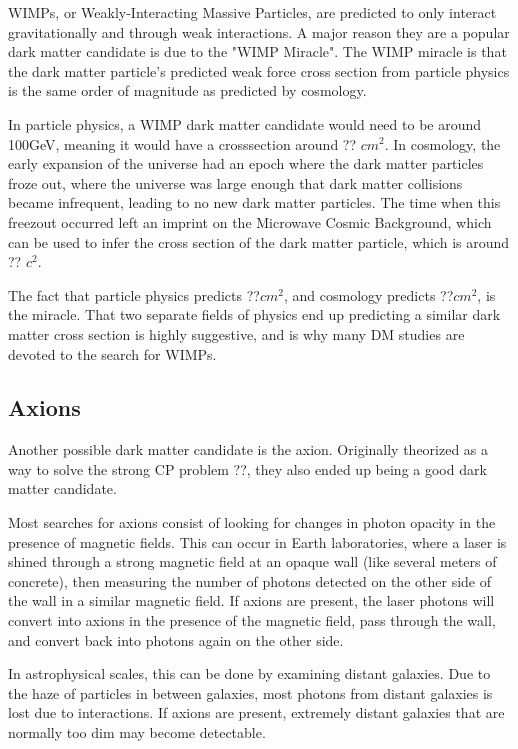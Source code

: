 WIMPs, or Weakly-Interacting Massive Particles, are predicted to only interact gravitationally and through weak interactions.
A major reason they are a popular dark matter candidate is due to the "WIMP Miracle".
The WIMP miracle is that the dark matter particle's predicted weak force cross section from particle physics is the same order of magnitude as predicted by cosmology.

In particle physics, a WIMP dark matter candidate would need to be around 100GeV, meaning it would have a crosssection around ?? $cm^{2}$.
In cosmology, the early expansion of the universe had an epoch where the dark matter particles froze out, where the universe was large enough that dark matter collisions became infrequent, leading to no new dark matter particles.
The time when this freezout occurred left an imprint on the Microwave Cosmic Background, which can be used to infer the cross section of the dark matter particle, which is around ?? $c^{2}$.

The fact that particle physics predicts ??$cm^{2}$, and cosmology predicts ??$cm^{2}$, is the miracle.
That two separate fields of physics end up predicting a similar dark matter cross section is highly suggestive, and is why many DM studies are devoted to the search for WIMPs.


\subsection{Axions}

Another possible dark matter candidate is the axion.
Originally theorized as a way to solve the strong CP problem ??, they also ended up being a good dark matter candidate.

Most searches for axions consist of looking for changes in photon opacity in the presence of magnetic fields.
This can occur in Earth laboratories, where a laser is shined through a strong magnetic field at an opaque wall (like several meters of concrete), then measuring the number of photons detected on the other side of the wall in a similar magnetic field.
If axions are present, the laser photons will convert into axions in the presence of the magnetic field, pass through the wall, and convert back into photons again on the other side.

In astrophysical scales, this can be done by examining distant galaxies.
Due to the haze of particles in between galaxies, most photons from distant galaxies is lost due to interactions.
If axions are present, extremely distant galaxies that are normally too dim may become detectable.


